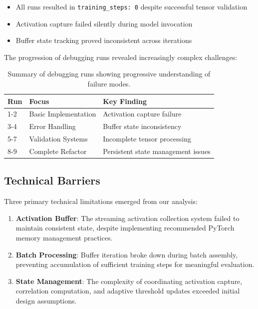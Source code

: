 \documentclass{article} %
\begin{document}
\begin{itemize}
    \item All runs resulted in \texttt{training\_steps: 0} despite successful tensor validation
    \item Activation capture failed silently during model invocation
    \item Buffer state tracking proved inconsistent across iterations
\end{itemize}

The progression of debugging runs revealed increasingly complex challenges:

\begin{table}[t]
\centering
\begin{tabular}{lll}
\toprule
Run & Focus & Key Finding \\
\midrule
1-2 & Basic Implementation & Activation capture failure \\
3-4 & Error Handling & Buffer state inconsistency \\
5-7 & Validation Systems & Incomplete tensor processing \\
8-9 & Complete Refactor & Persistent state management issues \\
\bottomrule
\end{tabular}
\caption{Summary of debugging runs showing progressive understanding of failure modes.}
\label{tab:debug_runs}
\end{table}

\subsection{Technical Barriers}
Three primary technical limitations emerged from our analysis:

\begin{enumerate}
    \item \textbf{Activation Buffer}: The streaming activation collection system failed to maintain consistent state, despite implementing recommended PyTorch memory management practices.
    
    \item \textbf{Batch Processing}: Buffer iteration broke down during batch assembly, preventing accumulation of sufficient training steps for meaningful evaluation.
    
    \item \textbf{State Management}: The complexity of coordinating activation capture, correlation computation, and adaptive threshold updates exceeded initial design assumptions.
\end{enumerate}
\end{document}
